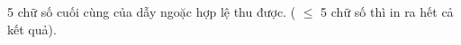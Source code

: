 5 chữ số cuối cùng của dẫy ngoặc hợp lệ thu được. ( $\le$  5 chữ số thì in ra hết cả kết quả).